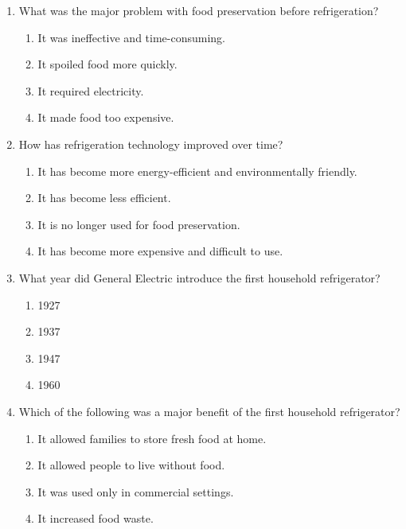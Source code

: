 \documentclass[12pt]{article}
\begin{document}
\begin{enumerate}
    \item What was the major problem with food preservation before refrigeration?
    \begin{enumerate}[label=\Alph*.]
        \item It was ineffective and time-consuming.
        \item It spoiled food more quickly.
        \item It required electricity.
        \item It made food too expensive.
    \end{enumerate}
    \vspace{0.5cm}

    \item How has refrigeration technology improved over time?
    \begin{enumerate}[label=\Alph*.]
        \item It has become more energy-efficient and environmentally friendly.
        \item It has become less efficient.
        \item It is no longer used for food preservation.
        \item It has become more expensive and difficult to use.
    \end{enumerate}
    \vspace{0.5cm}

    \item What year did General Electric introduce the first household refrigerator?
    \begin{enumerate}[label=\Alph*.]
        \item 1927
        \item 1937
        \item 1947
        \item 1960
    \end{enumerate}
    \vspace{0.5cm}

    \item Which of the following was a major benefit of the first household refrigerator?
    \begin{enumerate}[label=\Alph*.]
        \item It allowed families to store fresh food at home.
        \item It allowed people to live without food.
        \item It was used only in commercial settings.
        \item It increased food waste.
    \end{enumerate}
    \vspace{0.5cm}


\end{enumerate}
\end{document}
